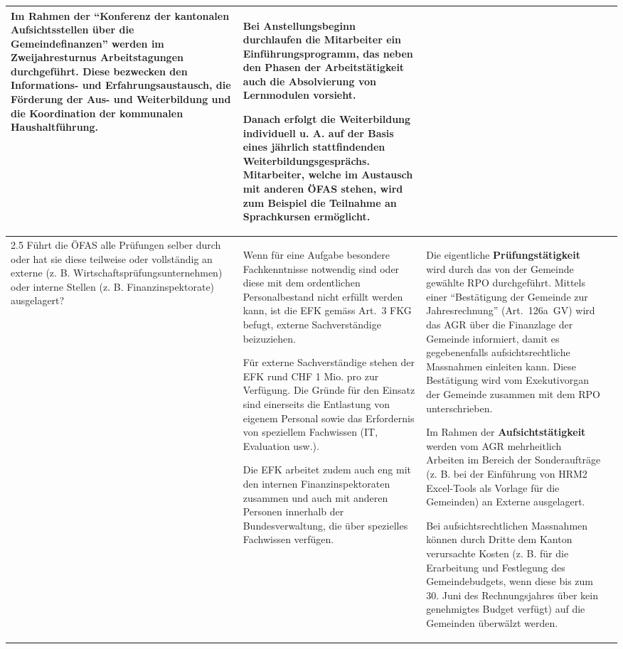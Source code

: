 \documentclass[10pt]{article}
\begin{document}
\begin{landscape}
\begin{center}
\begin{longtable}{|p{4cm}|p{5cm}|p{7.5cm}|p{7.5cm}|}
Im Rahmen der “{}Konferenz der kantonalen Aufsichtsstellen über die Gemeindefinanzen”{} werden im Zweijahresturnus Arbeitstagungen durchgeführt. Diese bezwecken den Informations- und Erfahrungs­austausch, die Förderung der Aus- und Weiterbildung und die Koordination der kommunalen Haushaltführung.

 & Bei Anstellungsbeginn durchlaufen die Mitarbeiter ein Einführungsprogramm, das neben den Phasen der Arbeitstätigkeit auch die Absolvierung von Lernmodulen vorsieht.

Danach erfolgt die Weiter­bildung individuell u. A. auf der Basis eines jährlich statt­findenden Weiterbildungs­gesprächs. Mitarbeiter, welche im Austausch mit anderen ÖFAS stehen, wird zum Beispiel die Teilnahme an Sprachkursen ermöglicht.

 \\
\hline
2.5 Führt die ÖFAS alle Prüfungen selber durch oder hat sie diese teilweise oder vollständig an externe (z. B. Wirtschaftsprüfungsunternehmen) oder interne Stellen (z. B. Finanzinspektorate) ausgelagert? & Wenn für eine Aufgabe besondere Fach­kenntnisse notwendig sind oder diese mit dem ordentlichen Personalbestand nicht erfüllt werden kann, ist die EFK gemäss Art.~3 FKG befugt, externe Sachverständige beizuziehen.

Für externe Sachverständige stehen der EFK rund CHF 1 Mio. pro zur Verfügung. Die Gründe für den Einsatz sind einerseits die Entlastung von eigenem Personal sowie das Erfordernis von speziellem Fachwissen (IT, Evaluation usw.).

Die EFK arbeitet zudem auch eng mit den internen Finanzinspekto­raten zusammen und auch mit anderen Personen innerhalb der Bundesverwaltung, die über spezielles Fachwissen verfügen.

 & Die eigentliche \textbf{Prüfungstätigkeit} wird durch das von der Gemeinde gewählte RPO durchgeführt. Mittels einer “{}Bestätigung der Gemeinde zur Jahresrechnung”{} (Art.~126a~GV) wird das AGR über die Finanzlage der Gemeinde informiert, damit es gegebenenfalls aufsichtsrechtliche Massnahmen einleiten kann. Diese Bestätigung wird vom Exekutiv­organ der Gemeinde zusammen mit dem RPO unterschrieben.

Im Rahmen der \textbf{Aufsichtstätigkeit} werden vom AGR mehrheitlich Arbeiten im Bereich der Sonder­aufträge (z. B. bei der Einführung von HRM2 Excel-Tools als Vorlage für die Gemeinden) an Externe ausgelagert.

Bei aufsichtsrechtlichen Mass­nahmen können durch Dritte dem Kanton verursachte Kosten (z. B. für die Erarbeitung und Festlegung des Gemeindebudgets, wenn diese bis zum 30. Juni des Rechnungs­jahres über kein genehmigtes Budget verfügt) auf die Gemeinden überwälzt werden.


\end{longtable}
\end{center}
\end{landscape}
\end{document}
